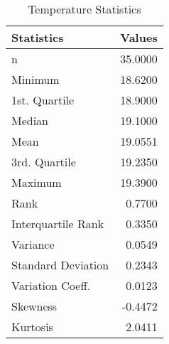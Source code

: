 \begin{table}
\centering
\caption{Temperature Statistics}
\label{tab:Temperature_Statistics}
\begin{tabular}{lr}
\toprule
        Statistics &  Values \\
\midrule
                 n & 35.0000 \\
           Minimum & 18.6200 \\
     1st. Quartile & 18.9000 \\
            Median & 19.1000 \\
              Mean & 19.0551 \\
     3rd. Quartile & 19.2350 \\
           Maximum & 19.3900 \\
              Rank &  0.7700 \\
Interquartile Rank &  0.3350 \\
          Variance &  0.0549 \\
Standard Deviation &  0.2343 \\
  Variation Coeff. &  0.0123 \\
          Skewness & -0.4472 \\
          Kurtosis &  2.0411 \\
\bottomrule
\end{tabular}
\end{table}
